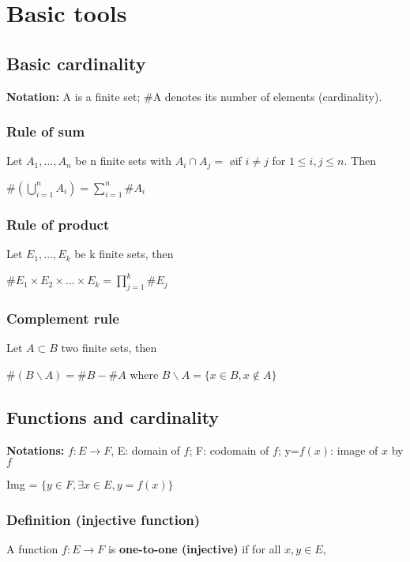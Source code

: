 \section{Basic tools}
		\subsection{Basic cardinality}
			\textbf{Notation:} A is a finite set; \#A denotes its number of elements (cardinality).
			\subsubsection{Rule of sum} Let $A_1, ..., A_n$ be n finite sets with $A_i \cap A_j =$ \o if $i \neq j$ for $1 \leq i,j \leq n.$ Then

                \vspace{5pt}
				\centerline{$\#(\bigcup_{i=1}^{n}A_i)=\sum_{i=1}^{n}\#A_i$}
				
			\subsubsection{Rule of product} Let $E_1,...,E_k$ be k finite sets, then

                \vspace{5pt}
				\centerline{$\#E_1\times E_2\times ... \times E_k=\prod_{j=1}^{k}\#E_j$}
    
			\subsubsection{Complement rule} Let $A \subset B$ two finite sets, then

                \vspace{5pt}
				\centerline{$\#(B \backslash A)=\#B - \#A$ where $B \backslash A=\{ x \in B, x \notin A \}$}
		
		\subsection{Functions and cardinality}
			\textbf{Notations:} $f: E \rightarrow F$, E: domain of $f$; F: codomain of $f$; y=$f(x)$: image of $x$ by $f$
			
			\centerline{Img = $\{y \in F, \exists x\in E, y=f(x)\}$}
			
			\subsubsection{Definition (injective function)}
			A function $f:E \rightarrow F$ is \textbf{one-to-one (injective)} if for all $x,y \in E$,
   
